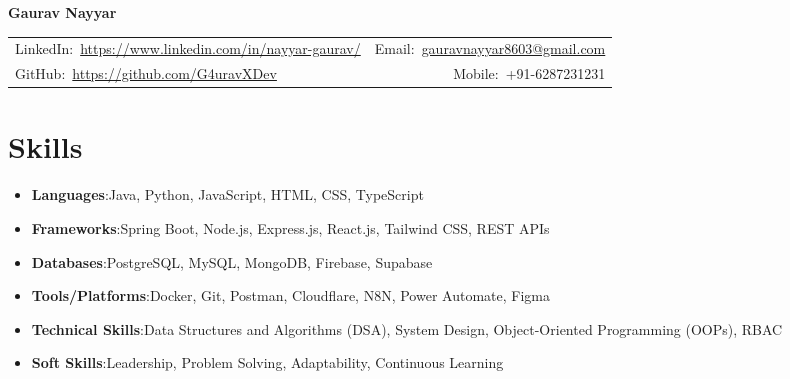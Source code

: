 \documentclass[10pt, a4paper]{article}
\begin{document}
{\color{headingblue}\bfseries\fontsize{18pt}{22pt}\selectfont Gaurav Nayyar}\par
\vspace{3pt}
\begin{tabularx}{\linewidth}{@{}X@{}r@{}}
  {\fontsize{8.5pt}{10pt}\selectfont LinkedIn:~\href{https://www.linkedin.com/in/nayyar-gaurav/}{https://www.linkedin.com/in/nayyar-gaurav/}} &
  {\fontsize{8.5pt}{10pt}\selectfont Email:~\href{mailto:gauravnayyar8603@gmail.com}{gauravnayyar8603@gmail.com}} \\[1pt]
  {\fontsize{8.5pt}{10pt}\selectfont GitHub:~\href{https://github.com/G4uravXDev}{https://github.com/G4uravXDev}} &
  {\fontsize{8.5pt}{10pt}\selectfont Mobile:~+91-6287231231}
\end{tabularx}

\section{Skills}
\begin{itemize}
  \item {\color{headingblue}\bfseries Languages}:\enspace Java, Python, JavaScript, HTML, CSS, TypeScript
  \item {\color{headingblue}\bfseries Frameworks}:\enspace Spring Boot, Node.js, Express.js, React.js, Tailwind CSS, REST APIs
  \item {\color{headingblue}\bfseries Databases}:\enspace PostgreSQL, MySQL, MongoDB, Firebase, Supabase
  \item {\color{headingblue}\bfseries Tools/Platforms}:\enspace Docker, Git, Postman, Cloudflare, N8N, Power Automate, Figma
  \item {\color{headingblue}\bfseries Technical Skills}:\enspace Data Structures and Algorithms (DSA), System Design, Object-Oriented Programming (OOPs), RBAC
  \item {\color{headingblue}\bfseries Soft Skills}:\enspace Leadership, Problem Solving, Adaptability, Continuous Learning
\end{itemize}

\end{document}
